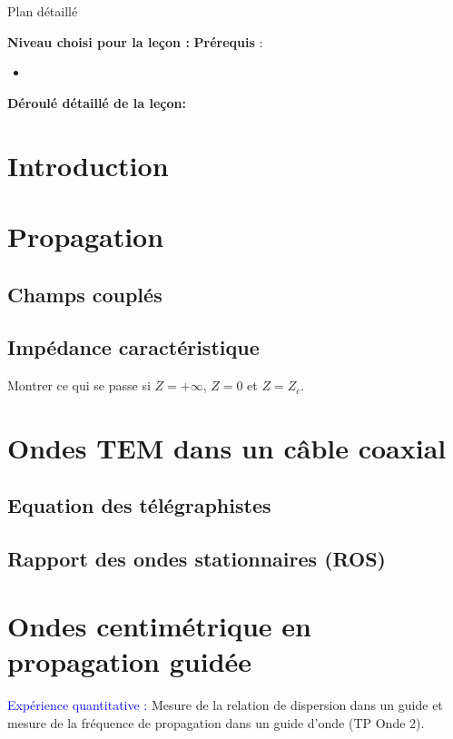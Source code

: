\begin{reportBlock}{Plan détaillé}

  \textbf{Niveau choisi pour la leçon :}
  \newline
  \textbf{Prérequis} : \begin{itemize}
      \item 
  \end{itemize}

  \textbf{Déroulé détaillé de la leçon: }  
  
  \section*{Introduction}

  \section{Propagation}
  \subsection{Champs couplés}
  \subsection{Impédance caractéristique}
  Montrer ce qui se passe si $Z=+\infty$, $Z=0$ et $Z=Z_c$.
  
  \section{Ondes TEM dans un câble coaxial}

  \subsection{Equation des télégraphistes}

  \subsection{Rapport des ondes stationnaires (ROS)}

  \section{Ondes centimétrique en propagation guidée}

  \textcolor{blue}{Expérience quantitative :} Mesure de la relation de dispersion dans un guide et mesure de la fréquence de propagation dans un guide d'onde (TP Onde 2).
  

\end{reportBlock}